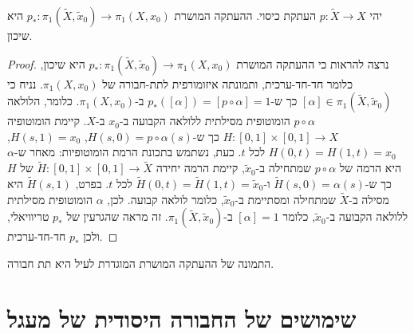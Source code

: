 \documentclass{tstextbook}
\begin{document}
\begin{proposition}
יהי \(p:\tilde{X}\to X\) העתקת כיסוי. ההעתקה המושרת \(p_{*}:\pi_{1}\left( \tilde{X},\tilde{x}_{0} \right)\to \pi_{1}(X,x_{0})\) היא שיכון.

\end{proposition}
\begin{proof}
נרצה להראות כי ההעתקה המושרת \(p_{*}:\pi_{1}\left( \tilde{X},\tilde{x}_{0} \right)\to \pi_{1}(X,x_{0})\) היא שיכון, כלומר חד-חד-ערכית, ותמונתה איזומורפית לתת-חבורה של \(\pi_{1}(X,x_{0})\).
נניח כי \([\alpha] \in \pi_{1}\left( \tilde{X},\tilde{x}_{0} \right)\) כך ש-\(p_{*}([\alpha]) = [p \circ \alpha] = 1\) ב-\(\pi_{1}(X,x_{0})\). כלומר, הלולאה \(p \circ \alpha\) הומוטופית מסילתית ללולאה הקבועה ב-\(x_{0}\) ב-\(X\). קיימת הומוטופיה \(H:[0,1]\times[0,1]\to X\) כך ש-\(H(s,0) = p \circ \alpha(s)\), \(H(s,1) = x_{0}\), \(H(0,t) = H(1,t) = x_{0}\) לכל \(t\).
כעת, נשתמש בתכונת הרמת הומוטופיות: מאחר ש-\(\alpha\) היא הרמה של \(p \circ \alpha\) שמתחילה ב-\(\tilde{x}_{0}\), קיימת הרמה יחידה \(\tilde{H}:[0,1]\times[0,1]\to \tilde{X}\) של \(H\) כך ש-\(\tilde{H}(s,0) = \alpha(s)\) ו-\(\tilde{H}(0,t) = \tilde{H}(1,t) = \tilde{x}_{0}\) לכל \(t\).
בפרט, \(\tilde{H}(s,1)\) היא מסילה ב-\(\tilde{X}\) שמתחילה ומסתיימת ב-\(\tilde{x}_{0}\), כלומר לולאה קבועה. לכן, \(\alpha\) הומוטופית מסילתית ללולאה הקבועה ב-\(\tilde{x}_{0}\), כלומר \([\alpha] = 1\) ב-\(\pi_{1}\left( \tilde{X},\tilde{x}_{0} \right)\). זה מראה שהגרעין של \(p_{*}\) טריוויאלי, ולכן \(p_{*}\) חד-חד-ערכית.

\end{proof}
\begin{corollary}
התמונה של ההעתקה המושרת המוגדרת לעיל היא תת חבורה.

\end{corollary}
\section{שימושים של החבורה היסודית של מעגל}
\end{document}
